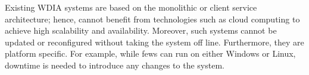 Existing WDIA systems are based on 
the monolithic or client service architecture; hence, cannot benefit from technologies such as cloud computing to achieve high scalability and availability. Moreover, such systems cannot be updated or reconfigured without taking the system off line. Furthermore, they are platform specific. For example, while \acrshort{fews} can run on either Windows or Linux, downtime is needed to introduce any changes to the system. 


